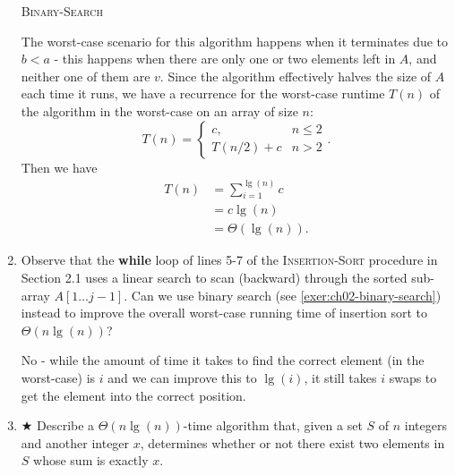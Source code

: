 \documentclass[Chapter02]{subfiles}
\begin{document}
\begin{enumerate}
\begin{answer}
			\begin{algorithm}[H]
				\caption{\textsc{Binary-Search}}
				\label{alg:ch02-binary-search}

			\end{algorithm}

			The worst-case scenario for this algorithm happens when it terminates due to $b < a$ - this happens when there are only one or two elements left in $A$, and neither one of them are $v$. Since the algorithm effectively halves the size of $A$ each time it runs, we have a recurrence for the worst-case runtime $T(n)$ of the algorithm in the worst-case on an array of size $n$:
			\[
				T(n) =
				\begin{cases}
					c, &n \leq 2\\
					T(n/2) + c &n > 2
				\end{cases}.
			\]
			Then we have
			\begin{align*}
				T(n) &= \sum_{i = 1}^{\lg(n)} c\\
				     &= c\lg(n)\\
				     &= \Theta(\lg(n)).
			\end{align*}
		\end{answer}

		\item Observe that the \textbf{while} loop of lines 5-7 of the \textsc{Insertion-Sort} procedure in Section 2.1 uses a linear search to scan (backward) through the sorted sub-array $A[1 \dots j - 1]$. Can we use binary search (see \cref{exer:ch02-binary-search}) instead to improve the overall worst-case running time of insertion sort to $\Theta(n \lg(n))$?
		\begin{answer}
			No - while the amount of time it takes to find the correct element (in the worst-case) is $i$ and we can improve this to $\lg(i)$, it still takes $i$ swaps to get the element into the correct position.
		\end{answer}

		\item $\bigstar$ Describe a $\Theta(n \lg(n))$-time algorithm that, given a set $S$ of $n$ integers and another integer $x$, determines whether or not there exist two elements in $S$ whose sum is exactly $x$.
		\begin{answer}
			\hfill\\
			\begin{algorithm}[H]


\end{algorithm}
\end{answer}
\end{enumerate}
\end{document}

